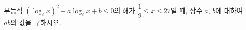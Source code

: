 부등식 $(\log_3 x)^2+a\log_3 x+b\le 0$의 해가 $\dfrac{1}{9}\le x\le 27$일 때, 상수 $a$, $b$에 대하여 $ab$의 값을 구하시오.
